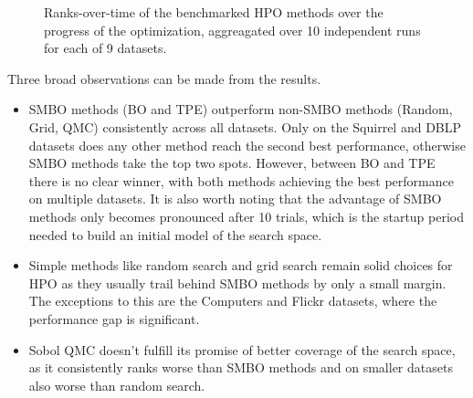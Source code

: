\begin{figure*}
	\centering
	\resizebox{\linewidth}{!}{%
		
	}
	\caption{Ranks-over-time of the benchmarked HPO methods over the progress of the optimization, aggreagated over 10 independent runs for each of 9 datasets.}
	\label{fig:benchmark-ranks}
\end{figure*}

Three broad observations can be made from the results.
\begin{itemize}
	\item SMBO methods (BO and TPE) outperform non-SMBO methods (Random, Grid, QMC) consistently across all datasets. Only on the Squirrel and DBLP datasets does any other method reach the second best performance, otherwise SMBO methods take the top two spots. However, between BO and TPE there is no clear winner, with both methods achieving the best performance on multiple datasets. It is also worth noting that the advantage of SMBO methods only becomes pronounced after 10 trials, which is the startup period needed to build an initial model of the search space.
	\item Simple methods like random search and grid search remain solid choices for HPO as they usually trail behind SMBO methods by only a small margin. The exceptions to this are the Computers and Flickr datasets, where the performance gap is significant.
	\item Sobol QMC doesn't fulfill its promise of better coverage of the search space, as it consistently ranks worse than SMBO methods and on smaller datasets also worse than random search.
\end{itemize}

